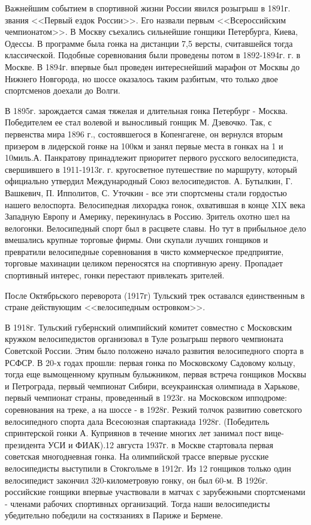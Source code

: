 \documentclass[a4paper,14pt]{extreport}
\begin{document}
Важнейшим событием в спортивной жизни России явился розыгрыш в 1891г. звания <<Первый ездок России>>. Его назвали первым <<Всероссийским чемпионатом>>. В Москву съехались сильнейшие гонщики Петербурга, Киева, Одессы. В программе была гонка на дистанции 7,5 версты, считавшейся тогда классической. Подобные соревнования были проведены потом в 1892-1894г. г. в Москве. В 1894г. впервые был проведен интереснейший марафон от Москвы до Нижнего Новгорода, но шоссе оказалось таким разбитым, что только двое спортсменов доехали до Волги.

В 1895г. зарождается самая тяжелая и длительная гонка Петербург - Москва. Победителем ее стал волевой и выносливый гонщик М. Дзевочко. Так, с первенства мира 1896 г., состоявшегося в Копенгагене, он вернулся вторым призером в лидерской гонке на 100км и занял первые места в гонках на 1 и 10миль.А. Панкратову принадлежит приоритет первого русского велосипедиста, свершившего в 1911-1913г. г. кругосветное путешествие по маршруту, который официально утвердил Международный Союз велосипедистов. А. Бутылкин, Г. Вашкевич, П. Ипполитов, С. Уточкин - все эти спортсмены стали гордостью нашего велоспорта.
Велосипедная лихорадка гонок, охватившая в конце XIX века Западную Европу и Америку, перекинулась в Россию. Зритель охотно шел на велогонки. Велосипедный спорт был в расцвете славы. Но тут в прибыльное дело вмешались крупные торговые фирмы. Они скупали лучших гонщиков и превратили велосипедные соревнования в чисто коммерческое предприятие, торговые махинации целиком переносятся на спортивную арену. Пропадает спортивный интерес, гонки перестают привлекать зрителей.

После Октябрьского переворота (1917г) Тульский трек оставался единственным в стране действующим <<велосипедным островком>>. 

В 1918г. Тульский губернский олимпийский комитет совместно с Московским кружком велосипедистов организовал в Туле розыгрыш первого чемпионата Советской России. Этим было положено начало развития велосипедного спорта в РСФСР. В 20-х годах прошли: первая гонка по Московскому Садовому кольцу, тогда еще вымощенному крупным булыжником, первая встреча гонщиков Москвы и Петрограда, первый чемпионат Сибири, всеукраинская олимпиада в Харькове, первый чемпионат страны, проведенный в 1923г. на Московском ипподроме: соревнования на треке, а на шоссе - в 1928г. Резкий толчок развитию советского велосипедного спорта дала Всесоюзная спартакиада 1928г. (Победитель спринтерской гонки А. Куприянов в течение многих лет занимал пост вице-президента УСИ и ФИАК).12 августа 1937г. в Москве стартовала первая советская многодневная гонка. На олимпийской трассе впервые русские велосипедисты выступили в Стокгольме в 1912г. Из 12 гонщиков только один велосипедист закончил 320-километровую гонку, он был 60-м. В 1926г. российские гонщики впервые участвовали в матчах с зарубежными спортсменами - членами рабочих спортивных организаций. Тогда наши велосипедисты убедительно победили на состязаниях в Париже и Бермене. 
\end{document}
